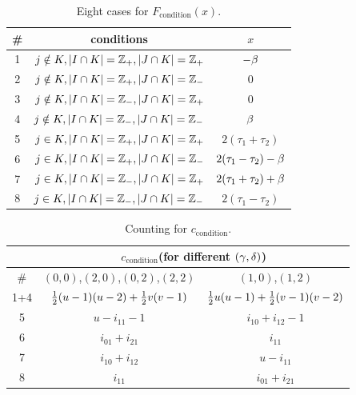 \documentclass[11pt]{article}
\renewcommand{\>}{\rangle}
\newcommand{\<}{\langle}
\begin{document}
\begin{table}
\begin{centering}
\begin{tabular}{|c|c|c|}
\hline 
\# & conditions & $x$\tabularnewline
\hline 
1 & $j\notin K,|I\cap K|=\mathbb{Z}_{+},|J\cap K|=\mathbb{Z}_{+}$ & $-\beta$\tabularnewline
\hline 
2 & $j\notin K,|I\cap K|=\mathbb{Z}_{+},|J\cap K|=\mathbb{Z}_{-}$ & 0\tabularnewline
\hline 
3 & $j\notin K,|I\cap K|=\mathbb{Z}_{-},|J\cap K|=\mathbb{Z}_{+}$ & 0\tabularnewline
\hline 
4 & $j\notin K,|I\cap K|=\mathbb{Z}_{-},|J\cap K|=\mathbb{Z}_{-}$ & $\beta$\tabularnewline
\hline 
5 & $j\in K,|I\cap K|=\mathbb{Z}_{+},|J\cap K|=\mathbb{Z}_{+}$ & $2(\tau_{1}+\tau_{2})$\tabularnewline
\hline 
6 & $j\in K,|I\cap K|=\mathbb{Z}_{+},|J\cap K|=\mathbb{Z}_{-}$ & $2(\tau_{1}-\tau_{2})-\beta$\tabularnewline
\hline 
7 & $j\in K,|I\cap K|=\mathbb{Z}_{-},|J\cap K|=\mathbb{Z}_{+}$ & $2(\tau_{1}+\tau_{2})+\beta$\tabularnewline
\hline 
8 & $j\in K,|I\cap K|=\mathbb{Z}_{-},|J\cap K|=\mathbb{Z}_{-}$ & $2(\tau_{1}-\tau_{2})$\tabularnewline
\hline 
\end{tabular}
\par\end{centering}
\caption{Eight cases for $F_{\text{condition}}(x)$. \label{tab:Eight-cases-for}}
\end{table}
\begin{table}
\begin{centering}
\begin{tabular}{|c|c||c||c||c|c||c|}
\hline 
 & \multicolumn{6}{c|}{$c_{\text{condition}}$(for different $(\gamma,\delta)$)}\tabularnewline
\hline 
\# & \multicolumn{4}{c|}{$(0,0)$,$(2,0)$,$(0,2)$,$(2,2)$} & \multicolumn{2}{c|}{$(1,0)$,$(1,2)$}\tabularnewline
\hline 
1+4 & \multicolumn{4}{c|}{$\frac{1}{2}(u-1)(u-2)+\frac{1}{2}v(v-1)$} & \multicolumn{2}{c|}{$\frac{1}{2}u(u-1)+\frac{1}{2}(v-1)(v-2)$}\tabularnewline
\hline 
5 & \multicolumn{4}{c|}{$u-i_{11}-1$} & \multicolumn{2}{c|}{$i_{10}+i_{12}-1$}\tabularnewline
\hline 
6 & \multicolumn{4}{c|}{$i_{01}+i_{21}$} & \multicolumn{2}{c|}{$i_{11}$}\tabularnewline
\hline 
7 & \multicolumn{4}{c|}{$i_{10}+i_{12}$} & \multicolumn{2}{c|}{$u-i_{11}$}\tabularnewline
\hline 
8 & \multicolumn{4}{c|}{$i_{11}$} & \multicolumn{2}{c|}{$i_{01}+i_{21}$}\tabularnewline
\hline 
\end{tabular}
\par\end{centering}
\caption{Counting for $c_{\text{condition}}$. \label{tab:c-cond}}
\end{table}
\end{document}
